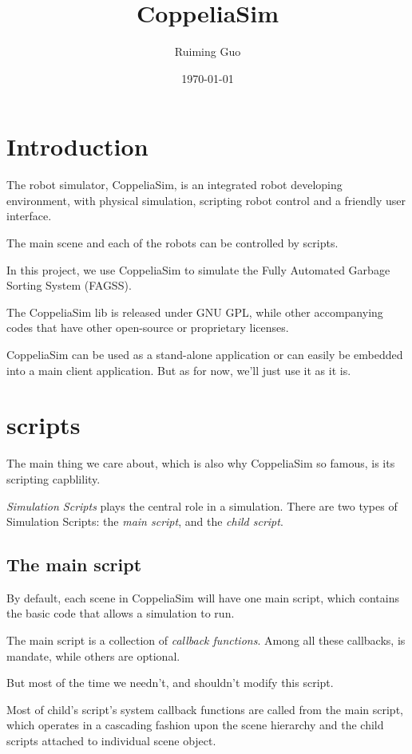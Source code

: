 \documentclass{article}
\title{CoppeliaSim}
\author{Ruiming Guo}
\date{\today}
\begin{document}
\maketitle

\section{Introduction}

The robot simulator, CoppeliaSim, is an integrated robot developing environment, with physical simulation, scripting robot control and a friendly user interface.

The main scene and each of the robots can be controlled by scripts.

In this project, we use CoppeliaSim to simulate the Fully Automated Garbage Sorting System (FAGSS).

The CoppeliaSim lib is released under GNU GPL, while other accompanying codes that have other open-source or proprietary licenses. 

CoppeliaSim can be used as a stand-alone application or can easily be embedded into a main client application. But as for now, we'll just use it as it is.

\section{scripts}

The main thing we care about, which is also why CoppeliaSim so famous, is its scripting capblility. 

\emph{Simulation Scripts} plays the central role in a simulation. There are two types of Simulation Scripts: the \emph{main script}, and the \emph{child script}.

\subsection{The main script}

By default, each scene in CoppeliaSim will have one main script, which contains the basic code that allows a simulation to run.

The main script is a collection of \emph{callback functions}. Among all these callbacks,  is mandate, while others are optional.

But most of the time we needn't, and shouldn't modify this script.

Most of child's script's system callback functions are called from the main script, which operates in a cascading fashion upon the scene hierarchy and the child scripts attached to individual scene object.
\end{document}
